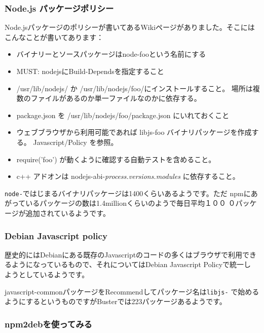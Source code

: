 \documentclass[mingoth,a4paper]{jsarticle}
\begin{document}
\subsubsection{Node.js パッケージポリシー}

Node.jsパッケージのポリシーが書いてあるWikiページがありました\cite{debian-nodejs-manual}。そこにはこんなことが書いてあります：

\begin{itemize}
 \item バイナリーとソースパッケージはnode-fooという名前にする

 \item MUST: nodejsにBuild-Dependsを指定すること

 \item /usr/lib/nodejs/ か /usr/lib/nodejs/foo/にインストールすること。
	場所は複数のファイルがあるのか単一ファイルなのかに依存する。
 \item package.json を /usr/lib/nodejs/foo/package.json にいれておくこと

 \item ウェブブラウザから利用可能であれば libjs-foo バイナリパッケージを作成する。 Javascript/Policy を参照。

 \item require('foo') が動くように確認する自動テストを含めること。

 \item c++ アドオンは nodejs-abi-{\it process.versions.modules} に依存すること。

\end{itemize}


\texttt{node-}ではじまるバイナリパッケージは1400くらいあるようです。ただ
npmにあがっているパッケージの数は1.4millionくらいのようで毎日平均１００
０パッケージが追加されているようです。

\subsubsection{Debian Javascript policy}

歴史的にはDebianにある既存のJavascriptのコードの多くはブラウザで利用でき
るようになっているもので、それについてはDebian Javascript Policyで統一し
ようとしているようです\cite{debian-javascript-policy}。

javascript-commonパッケージをRecommendしてパッケージ名は\texttt{libjs-}
で始めるようにするというものですがBusterでは223パッケージあるようです。

\subsubsection{npm2debを使ってみる}
\end{document}
